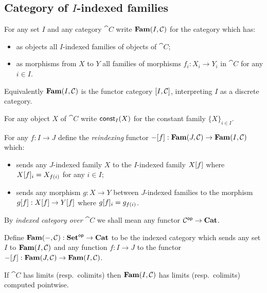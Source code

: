 \subsection{Category of $I$-indexed families}
\label{sec:fam}

\begin{definition}
\label{def:fam:Fam}
For any set $I$ and any category $\cat{C}$ write $\mathbf{Fam}(I,\mathcal{C})$ for the category which has:
\begin{itemize}
\item as objects all $I$-indexed families of objects of $\cat{C}$;
\item as morphisms from $X$ to $Y$ all families of morphisms $f_i: X_i \to Y_i$ in $\cat{C}$ for any $i \in
I$.
\end{itemize}
\end{definition}

\noindent Equivalently $\mathbf{Fam}(I,\mathcal{C})$ is the functor category $[I,\mathcal{C}]$, interpreting $I$ as a
discrete category.

\begin{definition}
For any object $X$ of $\cat{C}$ write $\mathsf{const}_I(X)$ for the constant family $\{X\}_{i \in I}$.
\end{definition}

\begin{definition}[Reindexing]
For any $f: I \to J$ define the \emph{reindexing} functor $-[f]: \mathbf{Fam}(J,\mathcal{C}) \to
\mathbf{Fam}(I,\mathcal{C})$ which:
\begin{itemize}
\item sends any $J$-indexed family $X$ to the $I$-indexed family $X[f]$ where $X[f]_i =
X_{f(i)}$ for any $i \in I$;
\item sends any morphism $g: X \to Y$ between $J$-indexed families to the morphism $g[f]:
X[f] \to Y[f]$ where $g[f]_i = g_{f(i)}$.
\end{itemize}
\end{definition}

By \emph{indexed category over $\cat{C}$} we shall mean any functor $\mathcal{C}^{\mathsf{op}} \to \mathbf{Cat}$.

\begin{definition}
Define $\mathbf{Fam}(-,\mathcal{C}): \mathbf{Set}^{\mathsf{op}} \to \mathbf{Cat}$ to be the indexed category which sends any set $I$ to
$\mathbf{Fam}(I,\mathcal{C})$ and any function $f: I \to J$ to the functor $-[f]: \mathbf{Fam}(J,\mathcal{C}) \to
\mathbf{Fam}(I,\mathcal{C})$.
\end{definition}

\begin{proposition}
If $\cat{C}$ has limits (resp.~colimits) then $\mathbf{Fam}(I,\mathcal{C})$ has limits (resp.~colimits) computed
pointwise.
\end{proposition}
